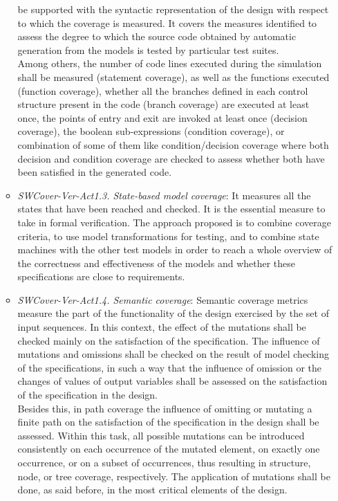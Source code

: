 \begin{itemize}
\begin{itemize}
  be supported with the syntactic representation of the design with
  respect to which the coverage is measured. It covers the measures
  identified to assess the degree to which the source code obtained by
  automatic generation from the models is tested by particular test
  suites. \\ 
  Among others, the number of code lines executed during the
  simulation shall be measured (statement coverage), as well as the
  functions executed (function coverage), whether all the branches
  defined in each control structure present in the code (branch
  coverage) are executed at least once, the points of entry and exit
  are invoked at least once (decision coverage), the boolean
  sub-expressions (condition coverage), or combination of some of them
  like condition/decision coverage where both decision and condition
  coverage are checked to assess whether both have been satisfied in
  the generated code.
\item {\it SWCover-Ver-Act1.3. State-based model coverage}: It
  measures all the states that have been reached and checked. It is
  the essential measure to take in formal verification. The approach
  proposed is to combine coverage criteria, to use model
  transformations for testing, and to combine state machines with the
  other test models in order to reach a whole overview of the
  correctness and effectiveness of the models and whether these
  specifications are close to requirements.
\item {\it SWCover-Ver-Act1.4. Semantic coverage}: Semantic coverage
  metrics measure the part of the functionality of the design
  exercised by the set of input sequences. In this context, the effect
  of the mutations shall be checked mainly on the satisfaction of the
  specification. The influence of mutations and omissions shall be
  checked on the result of model checking of the specifications, in
  such a way that the influence of omission or the changes of values
  of output variables shall be assessed on the satisfaction of the
  specification in the design. \\Besides this, in path coverage the
  influence of omitting or mutating a finite path on the satisfaction
  of the specification in the design shall be assessed. Within this
  task, all possible mutations can be introduced consistently on each
  occurrence of the mutated element, on exactly one occurrence, or on
  a subset of occurrences, thus resulting in structure, node, or tree
  coverage, respectively. The application of mutations shall be done,
  as said before, in the most critical elements of the design.

\end{itemize}
\end{itemize}
